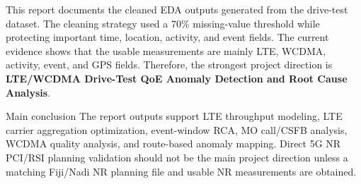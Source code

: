 \documentclass[12pt,a4paper]{article}
\begin{document}
This report documents the cleaned EDA outputs generated from the drive-test dataset. The cleaning strategy used a 70\% missing-value threshold while protecting important time, location, activity, and event fields. The current evidence shows that the usable measurements are mainly LTE, WCDMA, activity, event, and GPS fields. Therefore, the strongest project direction is \textbf{LTE/WCDMA Drive-Test QoE Anomaly Detection and Root Cause Analysis}.

\begin{infobox}{Main conclusion}
The report outputs support LTE throughput modeling, LTE carrier aggregation optimization, event-window RCA, MO call/CSFB analysis, WCDMA quality analysis, and route-based anomaly mapping. Direct 5G NR PCI/RSI planning validation should not be the main project direction unless a matching Fiji/Nadi NR planning file and usable NR measurements are obtained.
\end{infobox}
\end{document}
